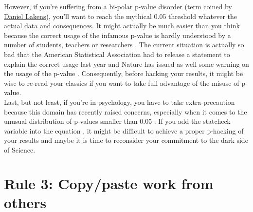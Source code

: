 \documentclass[a4paper,10pt,onecolumn]{article}
\begin{document}
However, if you're suffering from a bi-polar p-value disorder (term coined by
\href{http://daniellakens.blogspot.fr/2014/05/the-probability-of-p-values-as-function.html}{Daniel
  Lakens}), you'll want to reach the mythical 0.05 threshold whatever the
actual data and consequences. It might actually be much easier than you think
because the correct usage of the infamous p-value is hardly understood by a
number of students, teachers or researchers
\citep{haller:2002,lecoutre:2003}. The current situation is actually so bad
that the American Statistical Association had to release a statement to explain
the correct usage \citep{wasserstein:2016,} last year and Nature has issued as
well some warning on the usage of the p-value \citep{baker:2016}. Consequently,
before hacking your results, it might be wise to re-read your classics
\citep{simmons:2011,cumming:2012a,cumming:2012b,colquhoun:2014} if you want to take full advantage of the misuse of p-value.\\

Last, but not least, if you're in psychology, you have to take extra-precaution
because this domain has recently raised concerns, especially when it comes to
the unusual distribution of p-values smaller than 0.05
\citep{hartgerink:2016,bakker:2012}. If you add the statcheck variable into the
equation \citep{nuijten:2015,epskamp:2016}, it might be difficult to achieve a
proper p-hacking of your results and maybe it is time to reconsider your
commitment to the dark side of Science.

\section*{Rule 3: Copy/paste work from others}
\end{document}
